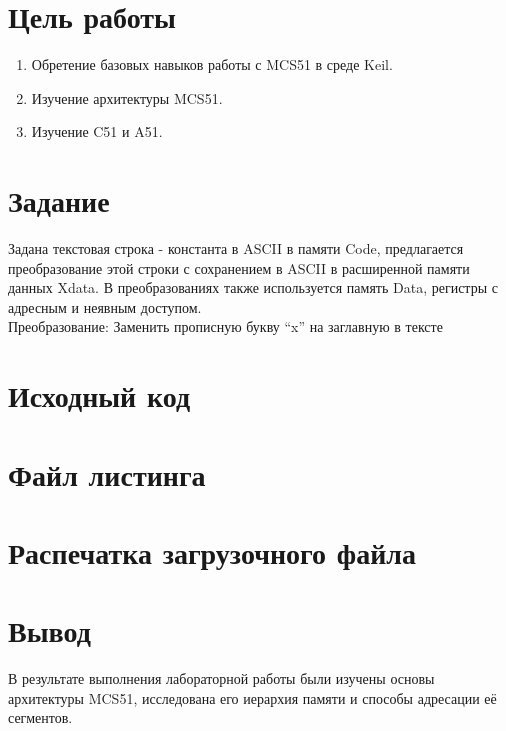 
\isonefalse
\def \labnum {2}
\def \labsubj {Организация ЭВМ и систем}
\def \labauthor {Айтуганов Д. А. \\ Чебыкин И. Б.}
\def \labgroup {P3301}
\def \labinsp {Скорубский В. И.}
\def \labname {}

\isnametrue
\lstset{
	caption=\lstname,
	basicstyle=\ttfamily\selectfont\scriptsize
}


\section*{Цель работы}
\begin{enumerate}
	\item Обретение базовых навыков работы с MCS51 в среде Keil.
	\item Изучение архитектуры MCS51.
	\item Изучение C51 и A51.
\end{enumerate}
\section*{Задание}
Задана текстовая строка - константа в ASCII в памяти Code, предлагается преобразование этой строки с сохранением в ASCII в расширенной памяти данных Xdata.
В преобразованиях также используется память Data, регистры с адресным и неявным доступом. \\
Преобразование: Заменить прописную букву “x” на заглавную в тексте
\section*{Исходный код}


\section*{Файл листинга}


\section*{Распечатка загрузочного файла}


\section*{Вывод}
В результате выполнения лабораторной работы были изучены основы архитектуры MCS51, исследована его иерархия памяти и способы адресации её сегментов.


